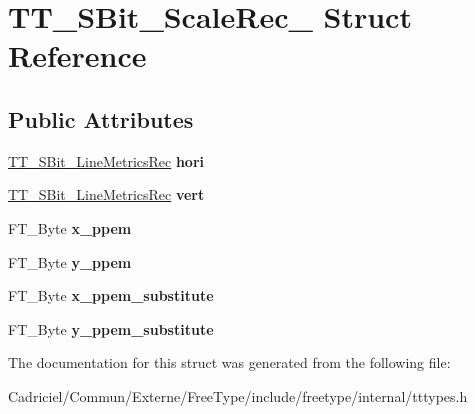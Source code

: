 \hypertarget{struct_t_t___s_bit___scale_rec__}{\section{T\-T\-\_\-\-S\-Bit\-\_\-\-Scale\-Rec\-\_\- Struct Reference}
\label{struct_t_t___s_bit___scale_rec__}
}
\subsection*{Public Attributes}
\begin{DoxyCompactItemize}
\item 
\hypertarget{struct_t_t___s_bit___scale_rec___a2a61bc97ebb7ed996170a03612ffbbc0}{\hyperlink{struct_t_t___s_bit___line_metrics_rec__}{T\-T\-\_\-\-S\-Bit\-\_\-\-Line\-Metrics\-Rec} {\bfseries hori}}\label{struct_t_t___s_bit___scale_rec___a2a61bc97ebb7ed996170a03612ffbbc0}

\item 
\hypertarget{struct_t_t___s_bit___scale_rec___acbf5c459602d9f52ac04a914e2f12375}{\hyperlink{struct_t_t___s_bit___line_metrics_rec__}{T\-T\-\_\-\-S\-Bit\-\_\-\-Line\-Metrics\-Rec} {\bfseries vert}}\label{struct_t_t___s_bit___scale_rec___acbf5c459602d9f52ac04a914e2f12375}

\item 
\hypertarget{struct_t_t___s_bit___scale_rec___a235731b0452ea063cccacd2f59b3f44c}{F\-T\-\_\-\-Byte {\bfseries x\-\_\-ppem}}\label{struct_t_t___s_bit___scale_rec___a235731b0452ea063cccacd2f59b3f44c}

\item 
\hypertarget{struct_t_t___s_bit___scale_rec___aa4c1fb419ea55c8c587ba81700c6ce66}{F\-T\-\_\-\-Byte {\bfseries y\-\_\-ppem}}\label{struct_t_t___s_bit___scale_rec___aa4c1fb419ea55c8c587ba81700c6ce66}

\item 
\hypertarget{struct_t_t___s_bit___scale_rec___a71955e363b0b5da84ed2c15d0e6f832d}{F\-T\-\_\-\-Byte {\bfseries x\-\_\-ppem\-\_\-substitute}}\label{struct_t_t___s_bit___scale_rec___a71955e363b0b5da84ed2c15d0e6f832d}

\item 
\hypertarget{struct_t_t___s_bit___scale_rec___a3a9f554d0153f9e3022898c1f59a7b63}{F\-T\-\_\-\-Byte {\bfseries y\-\_\-ppem\-\_\-substitute}}\label{struct_t_t___s_bit___scale_rec___a3a9f554d0153f9e3022898c1f59a7b63}

\end{DoxyCompactItemize}


The documentation for this struct was generated from the following file\-:\begin{DoxyCompactItemize}
\item 
Cadriciel/\-Commun/\-Externe/\-Free\-Type/include/freetype/internal/tttypes.\-h\end{DoxyCompactItemize}
